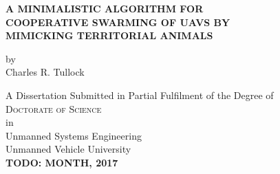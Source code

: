 
\begin{titlepage}
	\begin{center}

		\vspace*{1cm}
		 
		\large{ \textbf{ \uppercase{A minimalistic algorithm for\\cooperative swarming of UAVs by\\mimicking territorial animals}}}
		
		
		\vspace{1.5cm}
		
		by\\
		Charles R. Tullock\\
		
		\vspace{1.5cm}

		A Dissertation Submitted in Partial Fulfilment of the Degree of\\
		\large{\textsc{Doctorate of Science}}\\
		in\\
		\large{Unmanned Systems Engineering}\\
		\vspace{1cm}
		\large{Unmanned Vehicle University}\\		
		
		\vspace{2cm}
		\textbf{TODO: MONTH, 2017}
		
		\vfill

	\end{center}
\thispagestyle{empty}
\end{titlepage}

